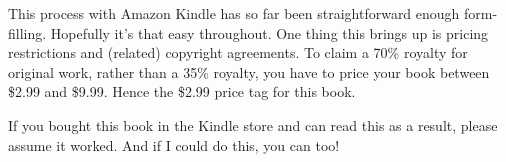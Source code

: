 This process with Amazon Kindle has so far been straightforward enough form-filling. Hopefully it's that easy throughout.
One thing this brings up is pricing restrictions and (related) copyright agreements. To claim a 70\% royalty for original work,
rather than a 35\% royalty, you have to price your book between \$2.99 and \$9.99. Hence the \$2.99 price tag for this book.

If you bought this book in the Kindle store and can read this as a result, please assume it worked. And if I could do this, you can too!





